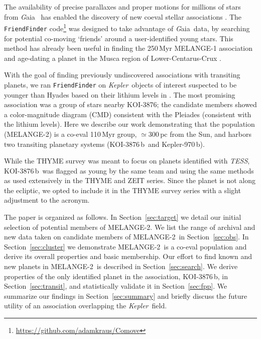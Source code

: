 \documentclass[twocolumn]{aastex631}
\newcommand{\clustername}{MELANGE-2}
\newcommand{\planetname}{KOI-3876\,b}
\newcommand{\planetnametwo}{Kepler-970\,b}
\newcommand{\kepler}{{\it Kepler}}
\newcommand{\tess}{\textit{TESS}}
\newcommand{\gaia}{{\textit Gaia}}
\newcommand{\association}{MELANGE-2}
\begin{document}
The availability of precise parallaxes and proper motions for millions of stars from \gaia\ \citep{Gaia_mission2016, GaiaEDR3} has enabled the discovery of new coeval stellar associations \citep[e.g.,][]{2019A&A...622L..13M, 2021arXiv210509338K}. The \texttt{FriendFinder} code\footnote{\url{https://github.com/adamkraus/Comove}} \citep{THYMEV} was designed to take advantage of \gaia\ data, by searching for potential co-moving `friends' around a user-identified young stars. This method has already been useful in finding the 250\,Myr MELANGE-1 association \citep{THYMEV} and age-dating a planet in the Musca region of Lower-Centarus-Crux \citep{2021arXiv211009531M}. 

With the goal of finding previously undiscovered associations with transiting planets, we ran \texttt{FriendFinder} on \kepler\ objects of interest suspected to be younger than Hyades based on their lithium levels in \citet{2018ApJ...855..115B}. The most promising association was a group of stars nearby KOI-3876; the candidate members showed a color-magnitude diagram (CMD) consistent with the Pleiades (consistent with the lithium levels). Here we describe our work demonstrating that the population (\association) is a co-eval 110\,Myr group, $\simeq$300\,pc from the Sun, and harbors two transiting planetary systems (\planetname\ and \planetnametwo).

While the THYME survey was meant to focus on planets identified with \tess, \planetname\ was flagged as young by the same team and using the same methods as used extensively in the THYME and ZEIT series. Since the planet is not along the ecliptic, we opted to include it in the THYME survey series with a slight adjustment to the acronym. 

The paper is organized as follows. In Section~\ref{sec:target} we detail our initial selection of potential members of \clustername. We list the range of archival and new data taken on candidate members of \clustername\ in Section~\ref{sec:obs}. In Section~\ref{sec:cluster} we demonstrate \clustername\ is a co-eval population and derive its overall properties and basic membership. Our effort to find known and new planets in \clustername\ is described in Section~\ref{sec:search}. We derive properties of the only identified planet in the association, \planetname, in Section~\ref{sec:transit}, and statistically validate it in Section~\ref{sec:fpp}. We summarize our findings in Section~\ref{sec:summary} and briefly discuss the future utility of an association overlapping the \kepler\ field. 
\end{document}
